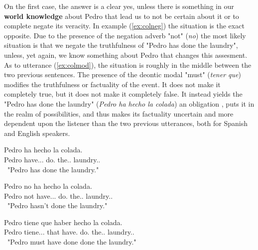 On the first case, the answer is a clear yes, unless there is something in our \textbf{world knowledge} about Pedro that lead us to not be certain about it or to complete negate its veracity. In example (\ref{ex:colneg}) the situation is the exact opposite. Due to the presence of the negation adverb "not" (\textit{no}) the most likely situation is that we negate the truthfulness of "Pedro has done the laundry", unless, yet again, we know something about Pedro that changes this assesment. As to utterance (\ref{ex:colmod}), the situation is roughly in the middle between the two previous sentences. The presence of the deontic modal "must" (\textit{tener que}) modifies the truthfulness or factuality of the event. It does not make it completely true, but it does not make it completely false. It instead yields the "Pedro has done the laundry" (\textit{Pedro ha hecho la colada}) an obligation \citep{morante2012modality}, puts it in the realm of possibilities, and thus makes its factuality uncertain and more dependent upon the listener than the two previous utterances, both for Spanish and English speakers.\\

\begin{exe}
  \ex
    \begin{xlist}
      \item  {\gll Pedro ha hecho la colada.\\ Pedro have.\Prs.\Ind.\Tsg{} do.\Ptcp{} the.\F.\Sg{} laundry.\M.\Sg{}\\\ "Pedro has done the laundry."\glt }\label{ex:colpos}
      \item  {\gll Pedro no ha hecho la colada.\\ Pedro not have.\Prs.\Ind.\Tsg{} do.\Ptcp{} the.\F.\Sg{} laundry.\M.\Sg{}\\\ "Pedro hasn't done the laundry."\glt }\label{ex:colneg}
      \item  {\gll Pedro tiene que haber hecho la colada.\\ Pedro tiene.\Prs.\Ind.\Tsg{} that have.\Inf{} do.\Ptcp{} the.\F.\Sg{} laundry.\M.\Sg{}\\\ "Pedro must have done done the laundry."\glt }\label{ex:colmod}
    \end{xlist}
\end{exe}

